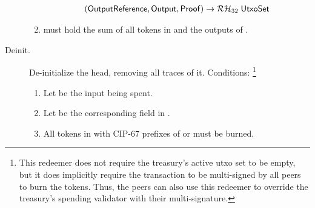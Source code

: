 \documentclass[../hydrozoa.tex]{subfiles}
\begin{document}
\begin{description}
\begin{enumerate}
\begin{equation*}
\begin{split}
            (\mathsf{OutputReference}, \mathsf{Output}, \mathsf{Proof}) ->
            \mathcal{RH}_{32} \; \mathsf{UtxoSet}
        \end{split}
        \end{equation*}
      \item {} must hold the sum of all tokens in  and the outputs of .
    \end{enumerate}
  \item[Deinit.] De-initialize the head, removing all traces of it.
    Conditions:%
    \footnote{This redeemer does not require the treasury's active utxo set to be empty, but it does implicitly require the transaction to be multi-signed by all peers to burn the  tokens.
      Thus, the peers can also use this redeemer to override the treasury's spending validator with their multi-signature.}
    \begin{enumerate}
      \item Let  be the input being spent.
      \item Let  be the corresponding field in .
      \item All  tokens in  with CIP-67 prefixes of  or  must be burned.
    \end{enumerate}
\end{description}
\end{document}
